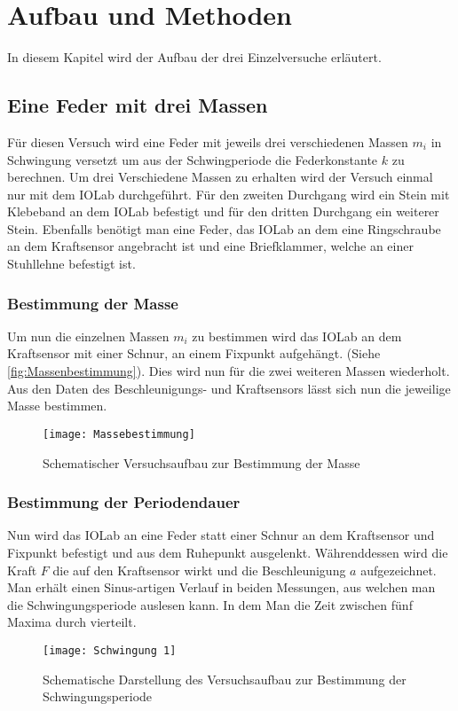 
\chapter{Aufbau und Methoden}
\label{sec:aufbau}
In diesem Kapitel wird der Aufbau der drei Einzelversuche erläutert.
\section{Eine Feder mit drei Massen}
Für diesen Versuch wird eine Feder mit jeweils drei verschiedenen Massen $m_i$ in Schwingung versetzt um aus der Schwingperiode die Federkonstante $k$ zu berechnen. Um drei Verschiedene Massen zu erhalten wird der Versuch einmal nur mit dem IOLab durchgeführt. Für den zweiten Durchgang wird ein Stein mit Klebeband an dem IOLab befestigt und für den dritten Durchgang ein weiterer Stein. Ebenfalls benötigt man eine Feder, das IOLab an dem eine Ringschraube an dem Kraftsensor angebracht ist und eine Briefklammer, welche an einer Stuhllehne befestigt ist.
\subsection{Bestimmung der Masse}
Um nun die einzelnen Massen $m_i$ zu bestimmen wird das IOLab an dem Kraftsensor mit einer Schnur, an einem Fixpunkt aufgehängt. (Siehe \autoref{fig:Massenbestimmung}). Dies wird nun für die zwei weiteren Massen wiederholt. Aus den Daten des Beschleunigungs- und Kraftsensors lässt sich nun die jeweilige Masse bestimmen. 
\begin{figure}[H]
	\centering
	\texttt{[image: Massebestimmung]}
	\caption[Versuchsaufbau der Massebestimmung]{Schematischer Versuchsaufbau zur Bestimmung der Masse}
	\label{fig:Massenbestimmung}
\end{figure}
\subsection{Bestimmung der Periodendauer}
Nun wird das IOLab an eine Feder statt einer Schnur an dem Kraftsensor und Fixpunkt befestigt und aus dem Ruhepunkt ausgelenkt. Währenddessen wird die Kraft $F$ die auf den Kraftsensor wirkt und die Beschleunigung $a$ aufgezeichnet. Man erhält einen Sinus-artigen Verlauf in beiden Messungen, aus welchen man die Schwingungsperiode auslesen kann. In dem Man die Zeit zwischen fünf Maxima durch vierteilt.
\begin{figure}[H]
	\centering
	\texttt{[image: Schwingung 1]}
	\caption[Versuchsaufbau für eine Feder]{Schematische Darstellung des Versuchsaufbau zur Bestimmung der Schwingungsperiode}
	\label{fig:Schwingungsperiode1}
\end{figure}
